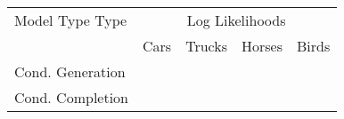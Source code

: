 \begin{table}[t]
\caption{
 }
\label{tab:op_complexities}
\begin{center}
\vspace{-1mm}

\begin{tabular}{lcccc}
\toprule
Model Type Type & \multicolumn{4}{c}{Log Likelihoods}  \\
           & Cars & Trucks  & Horses  & Birds \\
\hline
Cond. Generation & & & & \\
Cond. Completion & & & & \\






\bottomrule
\end{tabular}
\end{center}
\end{table}